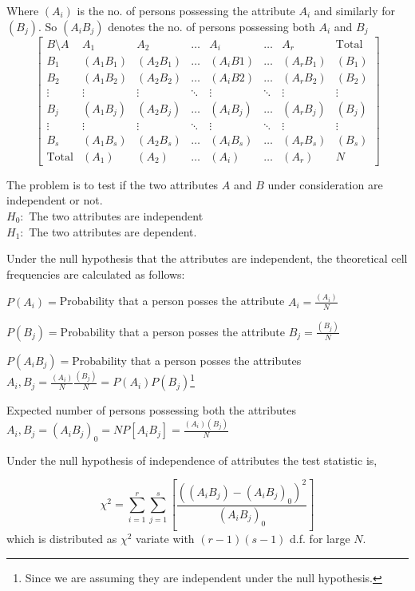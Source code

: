 \documentclass[oneside,11pt,pdftex]{book}%
\numberwithin{equation}{section}
\numberwithin{section}{chapter}
\numberwithin{equation}{chapter}
\begin{document}
 Where $ (A_i) $ is the no. of persons possessing the attribute $ A_i$ and similarly for $ (B_j) $. So $ (A_iB_j) $ denotes the no. of persons possessing both $ A_i $ and $ B_j $
\[ 
\begin{bmatrix}
	B\setminus A & A_1 & A_2 & \dots & A_i & \dots & A_r & \text{Total}\\
	B_1 & (A_1B_1) & (A_2 B_1) & \dots & (A_iB1) & \dots & (A_rB_1) & (B_1)\\
	B_2 & (A_1B_2) & (A_2 B_2) & \dots & (A_iB2) & \dots & (A_rB_2) & (B_2)\\
	\vdots & \vdots & \vdots & \ddots & \vdots & \ddots & \vdots & \vdots\\
	B_j & (A_1B_j) & (A_2 B_j) & \dots & (A_i B_j) & \dots & (A_rB_j) & (B_j)\\
	\vdots & \vdots & \vdots & \ddots & \vdots & \ddots & \vdots & \vdots\\
	B_s & (A_1B_s) & (A_2 B_s) & \dots & (A_i B_s) & \dots & (A_rB_s) & (B_s)\\
	\text{Total} & (A_1) & (A_2) & \dots & (A_i) & \dots & (A_r) & N
\end{bmatrix}
 \]

The problem is to test if the two attributes $ A $ and $ B $ under consideration are independent or not.\\
$ H_0: $ The two attributes are independent\\
$ H_1: $ The two attributes are dependent.

Under the null hypothesis that the attributes are independent, the theoretical cell frequencies are calculated as follows:

$ P(A_i) =$Probability that a person posses the attribute $ A_i =\frac{(A_i)}{N}$

$ P(B_j) =$Probability that a person posses the attribute $ B_j =\frac{(B_j)}{N}$

$ P(A_iB_j) =$Probability that a person posses the attributes $A_i, B_j =\frac{(A_i)}{N}\frac{(B_j)}{N}=P(A_i)P(B_j)$\footnote{Since we are assuming they are independent under the null hypothesis.}

Expected number of persons possessing both the attributes $ A_i,B_j=(A_iB_j)_0=NP[A_iB_j]=\frac{(A_i)(B_j)}{N} $

Under the null hypothesis of independence of attributes the test statistic is,

\[ \chi^2=\sum_{i=1}^r\sum_{j=1}^s \left[\frac{((A_iB_j)-(A_iB_j)_0)^2}{(A_iB_j)_0}\right] \] 
which is distributed as $ \chi^2 $ variate with $ (r-1)(s-1) $ d.f. for large $ N $.
\end{document}
